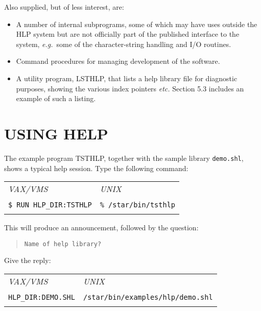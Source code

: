 Also supplied, but of less interest, are:
\begin{itemize}
\item A number of internal subprograms, some of which may have uses outside
the HLP system but are not officially part of the published interface
to the system,
{\it e.g.}\ some of the
character-string handling and I/O routines.
\item Command procedures for managing development of the software.
\item A utility program, LSTHLP, that lists a help library
file for diagnostic purposes, showing the various index pointers {\it etc.}
Section 5.3 includes an example of such a listing.
\end{itemize}

\section{USING HELP}
The example program TSTHLP, together with the sample library {\tt demo.shl},
shows a typical help session.
Type the following command:

\begin{tabular}{ll}
\\
{\it VAX/VMS} & {\it UNIX} \\ \\
{\tt \$ RUN HLP\_DIR:TSTHLP} &{\tt \% /star/bin/tsthlp} \\ \\
\end{tabular}

This will produce an announcement, followed by the question:
\begin{verse}
{\tt Name of help library?}
\end{verse}
Give the reply:

\begin{tabular}{ll}
\\
{\it VAX/VMS} & {\it UNIX} \\ \\
{\tt HLP\_DIR:DEMO.SHL} & {\tt /star/bin/examples/hlp/demo.shl} \\ \\
\end{tabular}

